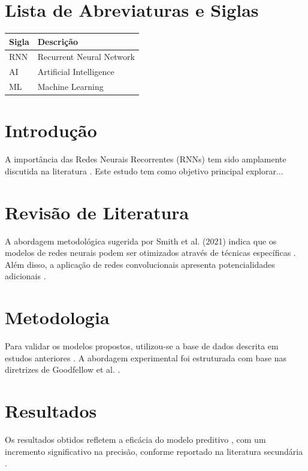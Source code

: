 \documentclass[a4paper,12pt]{report}
\begin{document}
	\chapter*{Lista de Abreviaturas e Siglas}
	\begin{longtable}{p{3cm} p{10cm}}
		\textbf{Sigla} & \textbf{Descrição} \\
		\hline
		RNN & Recurrent Neural Network \\
		AI & Artificial Intelligence \\
		ML & Machine Learning \\
	\end{longtable}
	
	\newpage
	
	\chapter{Introdução}
	A importância das Redes Neurais Recorrentes (RNNs) tem sido amplamente discutida na literatura \citep{goodfellow2016}. Este estudo tem como objetivo principal explorar...
	
	\chapter{Revisão de Literatura}
	A abordagem metodológica sugerida por Smith et al. (2021) indica que os modelos de redes neurais podem ser otimizados através de técnicas específicas \citep{smith2021optimization}. Além disso, a aplicação de redes convolucionais apresenta potencialidades adicionais \citep{krizhevsky2012}.
	
	\chapter{Metodologia}
	Para validar os modelos propostos, utilizou-se a base de dados descrita em estudos anteriores \citep{brown2020}. A abordagem experimental foi estruturada com base nas diretrizes de Goodfellow et al. \citep{goodfellow2016}.
	
	\chapter{Resultados}
	Os resultados obtidos refletem a eficácia do modelo preditivo \citep{noauthor2021}, com um incremento significativo na precisão, conforme reportado na literatura secundária \citep{johnson1999as}.
	
\end{document}
